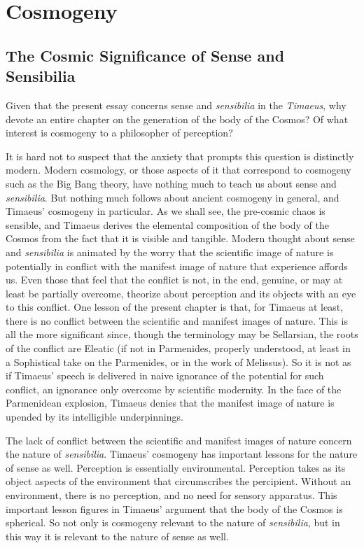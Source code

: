 \chapter{Cosmogeny} %
\label{cha:cosmogeny}

\section{The Cosmic Significance of Sense and Sensibilia} %
\label{sec:the_cosmic_significance_of_sensibilia}

Given that the present essay concerns sense and \emph{sensibilia} in the \emph{Timaeus}, why devote an entire chapter on the generation of the body of the Cosmos? Of what interest is cosmogeny to a philosopher of perception? 

It is hard not to suspect that the anxiety that prompts this question is distinctly modern. Modern cosmology, or those aspects of it that correspond to cosmogeny such as the Big Bang theory, have nothing much to teach us about sense and \emph{sensibilia}. But nothing much follows about ancient cosmogeny in general, and Timaeus' cosmogeny in particular. As we shall see, the pre-cosmic chaos is sensible, and Timaeus derives the elemental composition of the body of the Cosmos from the fact that it is visible and tangible. Modern thought about sense and \emph{sensibilia} is animated by the worry that the scientific image of nature is potentially in conflict with the manifest image of nature that experience affords us. Even those that feel that the conflict is not, in the end, genuine, or may at least be partially overcome, theorize about perception and its objects with an eye to this conflict. One lesson of the present chapter is that, for Timaeus at least, there is no conflict between the scientific and manifest images of nature. This is all the more significant since, though the terminology may be Sellarsian, the roots of the conflict are Eleatic (if not in Parmenides, properly understood, at least in a Sophistical take on the Parmenides, or in the work of Melissus). So it is not as if Timaeus' speech is delivered in naive ignorance of the potential for such conflict, an ignorance only overcome by scientific modernity. In the face of the Parmenidean explosion, Timaeus denies that the manifest image of nature is upended by its intelligible underpinnings. 

The lack of conflict between the scientific and manifest images of nature concern the nature of \emph{sensibilia}. Timaeus' cosmogeny has important lessons for the nature of sense as well. Perception is essentially environmental. Perception takes as its object aspects of the environment that circumscribes the percipient. Without an environment, there is no perception, and no need for sensory apparatus. This important lesson figures in Timaeus' argument that the body of the Cosmos is spherical. So not only is cosmogeny relevant to the nature of \emph{sensibilia}, but in this way it is relevant to the nature of sense as well.

